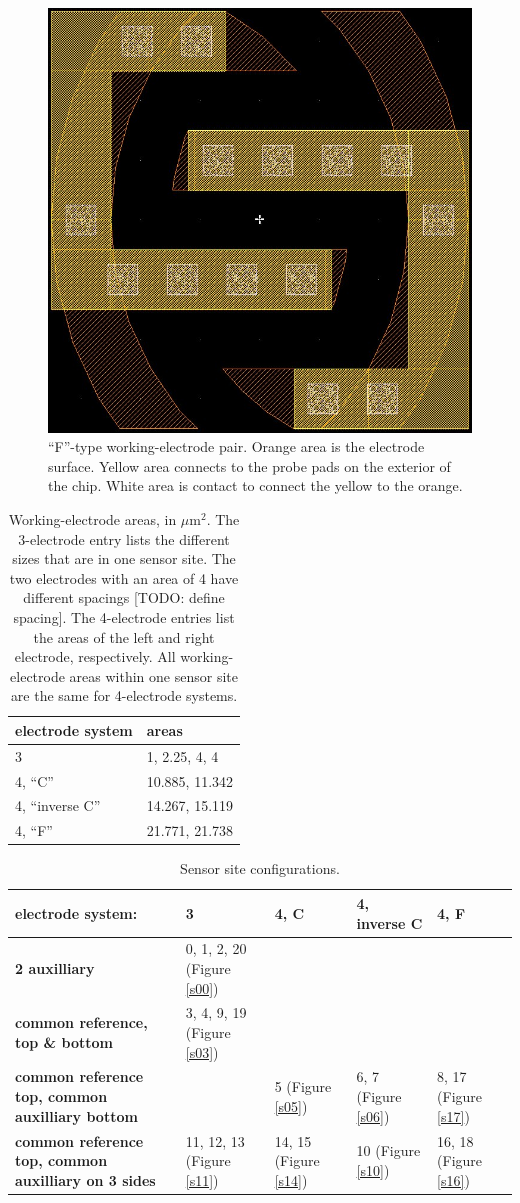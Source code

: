 \begin{figure}
	\centering
	\includegraphics[width=0.3\linewidth]{figures/4-F.png}
	\caption[``F''-type working-electrode pair.]{``F''-type working-electrode pair. Orange area is the electrode surface. Yellow area connects to the probe pads on the exterior of the chip. White area is contact to connect the yellow to the orange.}
	\label{4-F}
\end{figure}

\begin{table}
	\begin{tabular}{l|l}
		\textbf{electrode system} & \textbf{areas} \\
		\hline
		3 & 1, 2.25, 4, 4 \\
		4, ``C'' & 10.885, 11.342 \\
		4, ``inverse C'' & 14.267, 15.119 \\
		4, ``F'' & 21.771, 21.738
	\end{tabular}
	\caption[Working-electrode areas.]{Working-electrode areas, in $\mu \mathrm{m}^2$. The 3-electrode entry lists the different sizes that are in one sensor site. The two electrodes with an area of 4 have different spacings [TODO: define spacing]. The 4-electrode entries list the areas of the left and right electrode, respectively. All working-electrode areas within one sensor site are the same for 4-electrode systems.}
	\label{electrode-area}
\end{table}

\begin{table}
	\begin{tabular}{p{4cm}|p{2cm}|p{2cm}|p{2.5cm}|p{2cm}}
		electrode system: & \textbf{3} & \textbf{4, C} & \textbf{4, inverse C} & \textbf{4, F} \\
		\hline
		\textbf{2 auxilliary} & 0, 1, 2, 20 (Figure \ref{s00}) & & & \\
		\hline
		\textbf{common reference, top \& bottom} & 3, 4, 9, 19 (Figure \ref{s03}) & & & \\
		\hline
		\textbf{common reference top, common auxilliary bottom} & & 5 (Figure \ref{s05}) & 6, 7 (Figure \ref{s06}) & 8, 17 (Figure \ref{s17}) \\
		\hline
		\textbf{common reference top, common auxilliary on 3 sides} & 11, 12, 13 (Figure \ref{s11}) & 14, 15 (Figure \ref{s14}) & 10 (Figure \ref{s10}) & 16, 18 (Figure \ref{s16})
	\end{tabular}
	\caption{Sensor site configurations.}
	\label{sensor-config}
\end{table}

